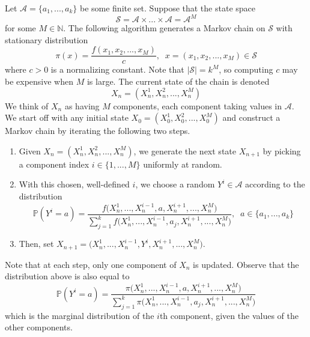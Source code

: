 \documentclass{article}
\begin{document}
      Let $\mathcal{A} = \{a_1, ..., a_k\}$ be some finite set. Suppose that the state space 
      \begin{equation}
        \mathcal{S} = \mathcal{A} \times ... \times \mathcal{A} = \mathcal{A}^M
      \end{equation}
      for some $M \in \mathbb{N}$. The following algorithm generates a Markov chain on $\mathcal{S}$ with stationary distribution
      \begin{equation}
        \pi(x) = \frac{f(x_1, x_2, ..., x_M)}{c}, \;\; x = (x_1, x_2, ..., x_M) \in \mathcal{S} 
      \end{equation}
      where $c >0$ is a normalizing constant. Note that $|\mathcal{S}| = k^M$, so computing $c$ may be expensive when $M$ is large. The current state of the chain is denoted 
      \begin{equation}
        X_n = (X_n^1, X_n^2, ..., X_n^M)
      \end{equation}
      We think of $X_n$ as having $M$ components, each component taking values in $\mathcal{A}$. We start off with any initial state $X_0 = (X_0^1, X_0^2, ..., X_0^M)$ and construct a Markov chain by iterating the following two steps. 
      \begin{enumerate}
        \item Given $X_n = (X_n^1, X_n^2, ..., X_n^M)$, we generate the next state $X_{n+1}$ by picking a component index $i \in \{1, ..., M\}$ uniformly at random. 
        \item With this chosen, well-defined $i$, we choose a random $Y^i \in \mathcal{A}$ according to the distribution
        \begin{equation}
          \mathbb{P}(Y^i = a) = \frac{f\big(X_n^1 ,..., X_n^{i-1}, a, X_n^{i+1}, ..., X_n^M\big)}{\sum_{j=1}^k f\big(X_n^1 ,..., X_n^{i-1}, a_j, X_n^{i+1}, ..., X_n^M\big)}, \;\; a \in \{a_1, ..., a_k\}
        \end{equation}
        \item Then, set $X_{n+1} = \big(X_n^1, ..., X_n^{i-1}, Y^i, X_n^{i+1}, ..., X_n^M\big)$. 
      \end{enumerate}
      Note that at each step, only one component of $X_n$ is updated. Observe that the distribution above is also equal to 
      \begin{equation}
        \mathbb{P}(Y^i = a) = \frac{\pi\big(X_n^1 ,..., X_n^{i-1}, a, X_n^{i+1}, ..., X_n^M\big)}{\sum_{j=1}^k \pi \big(X_n^1 ,..., X_n^{i-1}, a_j, X_n^{i+1}, ..., X_n^M\big)}
      \end{equation}
      which is the marginal distribution of the $i$th component, given the values of the other components. 
\end{document}
